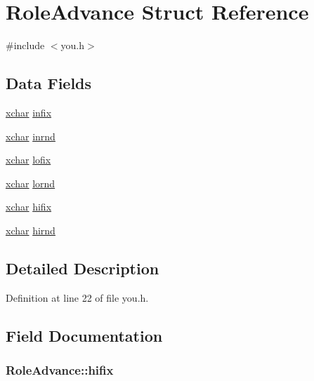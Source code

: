 \hypertarget{structRoleAdvance}{\section{Role\+Advance Struct Reference}
\label{structRoleAdvance}
}


{\ttfamily \#include $<$you.\+h$>$}

\subsection*{Data Fields}
\begin{DoxyCompactItemize}
\item 
\hyperlink{global_8h_a2043b7d01ce89f4ee2fa6c345a752d32}{xchar} \hyperlink{structRoleAdvance_a0756b60368efde4ff5738c291d96b02f}{infix}
\item 
\hyperlink{global_8h_a2043b7d01ce89f4ee2fa6c345a752d32}{xchar} \hyperlink{structRoleAdvance_adf36de29ced4989b180e963326151fb3}{inrnd}
\item 
\hyperlink{global_8h_a2043b7d01ce89f4ee2fa6c345a752d32}{xchar} \hyperlink{structRoleAdvance_ac38bf662d53d443f26f8c65775e39f12}{lofix}
\item 
\hyperlink{global_8h_a2043b7d01ce89f4ee2fa6c345a752d32}{xchar} \hyperlink{structRoleAdvance_a1e4f4dd4e5f7aa4ee3311999d99b3f47}{lornd}
\item 
\hyperlink{global_8h_a2043b7d01ce89f4ee2fa6c345a752d32}{xchar} \hyperlink{structRoleAdvance_aefc639bb4ba64fcedc2cb8a8d8824ea0}{hifix}
\item 
\hyperlink{global_8h_a2043b7d01ce89f4ee2fa6c345a752d32}{xchar} \hyperlink{structRoleAdvance_a6132e0002a06dea2c67661308488772f}{hirnd}
\end{DoxyCompactItemize}


\subsection{Detailed Description}


Definition at line 22 of file you.\+h.



\subsection{Field Documentation}
\hypertarget{structRoleAdvance_aefc639bb4ba64fcedc2cb8a8d8824ea0}{
\subsubsection[{hifix}]{ Role\+Advance\+::hifix}}\label{structRoleAdvance_aefc639bb4ba64fcedc2cb8a8d8824ea0}


